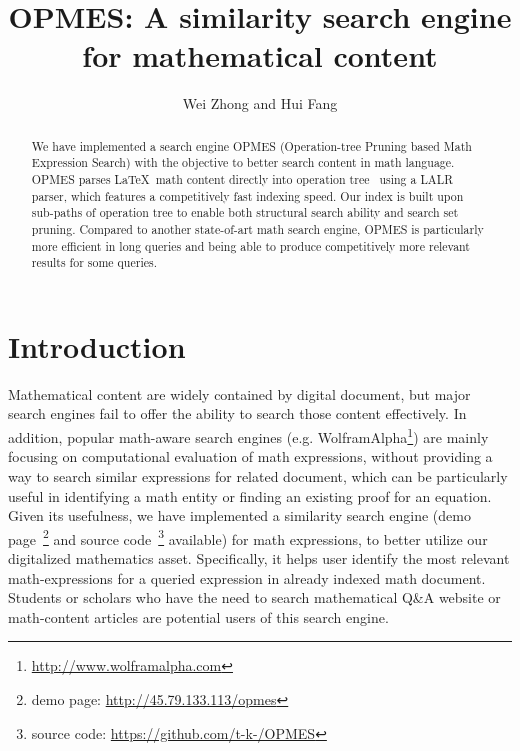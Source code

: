 \documentclass{llncs}
\begin{document}
\title{OPMES: A similarity search engine for mathematical content}
\author{Wei Zhong and Hui Fang}
\maketitle
%
\begin{abstract}
We have implemented a search engine OPMES (Operation-tree Pruning based Math Expression Search) with the objective to better search content in math language.
OPMES parses \LaTeX\ math content directly into operation tree~\cite{goodsurvey} using a LALR parser, which features a competitively fast indexing speed. 
Our index is built upon sub-paths of operation tree to enable both structural search ability and search set pruning. 
Compared to another state-of-art math search engine, OPMES is particularly more efficient in long queries and being able to produce competitively more relevant results for some queries.
\end{abstract}

\section{Introduction}
Mathematical content are widely contained by digital document, but major search engines fail to offer the ability to search those content effectively.
In addition, popular math-aware search engines (e.g. WolframAlpha\footnote{\url{http://www.wolframalpha.com}}) are mainly focusing
on computational evaluation of math expressions, without providing a way to search similar expressions for related document, which can be particularly useful in identifying a math entity or finding an existing proof for an equation.
Given its usefulness, we have implemented a similarity search engine (demo page~\footnote{demo page: \url{http://45.79.133.113/opmes}} and source code~\footnote{source code: \url{https://github.com/t-k-/OPMES}} available)
for math expressions, to better utilize our digitalized mathematics asset. 
Specifically, it helps user identify the most relevant math-expressions for a queried expression in already indexed math document.
Students or scholars who have the need to search mathematical Q\&A website or math-content articles are potential users of this search engine.
\end{document}
